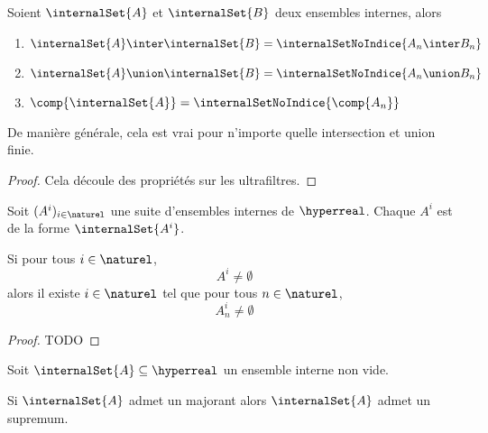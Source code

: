 \begin{proposition}
	Soient $\internalSet{A}$ et $\internalSet{B}$ deux ensembles internes,
	alors
	\begin{enumerate}
		\item $\internalSet{A} \inter \internalSet{B} = \internalSetNoIndice{A_{n}
			\inter B_{n}}$
		\item $\internalSet{A} \union \internalSet{B} = \internalSetNoIndice{A_{n}
			\union B_{n}}$
		\item $\comp{\internalSet{A}} = \internalSetNoIndice{\comp{A_{n}}}$
	\end{enumerate}

	De manière générale, cela est vrai pour n'importe quelle intersection et
	union finie.
\end{proposition}

\ifdefined\outputproof
\begin{proof}
	Cela découle des propriétés sur les ultrafiltres.
\end{proof}
\fi

\begin{proposition}
	Soit $(A^{i})_{i \in \naturel}$ une suite d'ensembles internes de
	$\hyperreal$.
	Chaque $A^{i}$ est de la forme $\internalSet{A^{i}}$.

	Si pour tous $i \in \naturel$,
	\begin{equation}
		A^{i} \neq \emptyset
	\end{equation}
	alors il existe $i \in \naturel$ tel que pour tous $n \in \naturel$,
	\begin{equation}
		A^{i}_{n} \neq \emptyset
	\end{equation}
\end{proposition}

\ifdefined\outputproof
\begin{proof}
	TODO
\end{proof}
\fi

\begin{proposition}
	Soit $\internalSet{A} \subseteq \hyperreal$ un ensemble interne non vide.

	Si $\internalSet{A}$ admet un majorant alors $\internalSet{A}$ admet un supremum.
\end{proposition}

